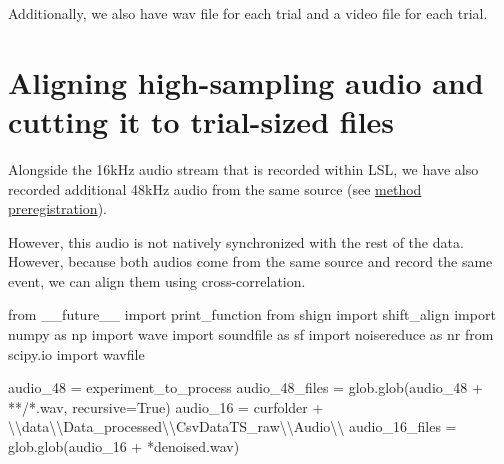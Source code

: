 \documentclass[
  letterpaper,
  DIV=11,
  numbers=noendperiod]{scrreprt}
\newenvironment{Shaded}{\begin{snugshade}}{\end{snugshade}}
\newcommand{\CharTok}[1]{\textcolor[rgb]{0.13,0.47,0.30}{#1}}
\newcommand{\ImportTok}[1]{\textcolor[rgb]{0.00,0.46,0.62}{#1}}
\newcommand{\NormalTok}[1]{\textcolor[rgb]{0.00,0.23,0.31}{#1}}
\newcommand{\OperatorTok}[1]{\textcolor[rgb]{0.37,0.37,0.37}{#1}}
\newcommand{\StringTok}[1]{\textcolor[rgb]{0.13,0.47,0.30}{#1}}
\newcommand{\VariableTok}[1]{\textcolor[rgb]{0.07,0.07,0.07}{#1}}
\begin{document}
Additionally, we also have wav file for each trial and a video file for
each trial.


\chapter{Aligning high-sampling audio and cutting it to trial-sized
files}\label{aligning-high-sampling-audio-and-cutting-it-to-trial-sized-files}

Alongside the 16kHz audio stream that is recorded within LSL, we have
also recorded additional 48kHz audio from the same source (see
\href{https://osf.io/3nygq}{method preregistration}).

However, this audio is not natively synchronized with the rest of the
data. However, because both audios come from the same source and record
the same event, we can align them using cross-correlation.

\begin{Shaded}
\begin{Highlighting}[]
\ImportTok{from}\NormalTok{ \_\_future\_\_ }\ImportTok{import}\NormalTok{ print\_function}
\ImportTok{from}\NormalTok{ shign }\ImportTok{import}\NormalTok{ shift\_align}
\ImportTok{import}\NormalTok{ numpy }\ImportTok{as}\NormalTok{ np}
\ImportTok{import}\NormalTok{ wave}
\ImportTok{import}\NormalTok{ soundfile }\ImportTok{as}\NormalTok{ sf}
\ImportTok{import}\NormalTok{ noisereduce }\ImportTok{as}\NormalTok{ nr}
\ImportTok{from}\NormalTok{ scipy.io }\ImportTok{import}\NormalTok{ wavfile}

\NormalTok{audio\_48 }\OperatorTok{=}\NormalTok{ experiment\_to\_process}
\NormalTok{audio\_48\_files }\OperatorTok{=}\NormalTok{ glob.glob(audio\_48 }\OperatorTok{+} \StringTok{\textquotesingle{}**/*.wav\textquotesingle{}}\NormalTok{, recursive}\OperatorTok{=}\VariableTok{True}\NormalTok{)}
\NormalTok{audio\_16 }\OperatorTok{=}\NormalTok{ curfolder }\OperatorTok{+} \StringTok{\textquotesingle{}}\CharTok{\textbackslash{}\textbackslash{}}\StringTok{data}\CharTok{\textbackslash{}\textbackslash{}}\StringTok{Data\_processed}\CharTok{\textbackslash{}\textbackslash{}}\StringTok{CsvDataTS\_raw}\CharTok{\textbackslash{}\textbackslash{}}\StringTok{Audio}\CharTok{\textbackslash{}\textbackslash{}}\StringTok{\textquotesingle{}}
\NormalTok{audio\_16\_files }\OperatorTok{=}\NormalTok{ glob.glob(audio\_16 }\OperatorTok{+} \StringTok{\textquotesingle{}*denoised.wav\textquotesingle{}}\NormalTok{)}
\end{Highlighting}
\end{Shaded}
\end{document}
